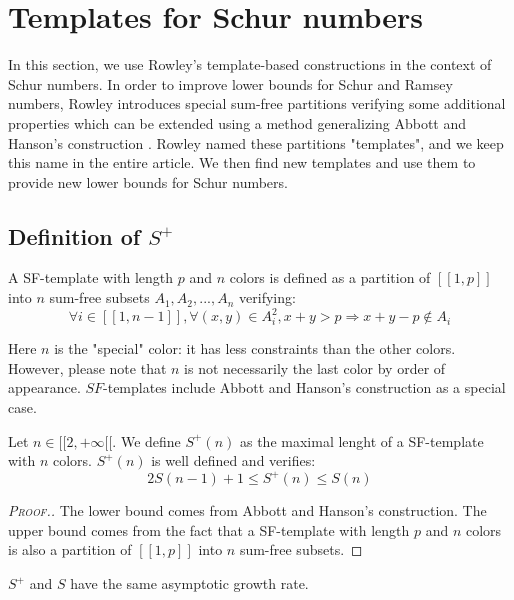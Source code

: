 \section{Templates for Schur numbers}
\label{Schur}

\qquad In this section, we use Rowley's template-based constructions \cite{RowleyRamsey} in the context of Schur 
numbers. In order to improve lower bounds for Schur and Ramsey numbers, Rowley introduces special sum-free 
partitions verifying some additional properties which can be extended using a method generalizing Abbott and 
Hanson's construction \cite{AbbottHanson}. Rowley named these partitions "templates", and we keep this name in 
the entire article. We then find new templates and use them to provide new lower bounds for Schur numbers.

\subsection{Definition of \(S^+\)}

\begin{definition}
A SF-template with length \(p\) and \(n\) colors is defined as a partition of \( [\![1,p]\!]\) into \(n\) sum-free subsets 
\(A_1, A_2, ..., A_n\) verifying:
\[
\forall i \in [\![1, n-1]\!], \forall (x,y) \in A_i^2, x+y > p
\Longrightarrow x+y-p \notin A_i
\]
\end{definition}

Here \(n\) is the "special" color: it has less constraints than the other colors. However, please note that \(n\) 
is not necessarily the last color by order of appearance. \(SF\)-templates include Abbott and Hanson's construction \cite{AbbottHanson}
as a special case.

\begin{proposition}
	Let \(n \in [\![2, +\infty[\![\). We define \(S^+(n)\) as the maximal lenght of a SF-template with \(n\) colors. 
	\(S^+(n)\) is well defined and verifies:
	\[
	2S(n-1)+1 \leqslant S^+(n) \leqslant S(n)
	\]
\end{proposition}

\begin{proof}[\textsc{Proof.}]
The lower bound comes from Abbott and Hanson's construction. The upper bound comes from the 
fact that a SF-template with length \(p\) and \(n\) colors is also a partition of \([\![1, p]\!]\) into \(n\) sum-free subsets.
\end{proof}

\begin{remark}
	\(S^+\) and \(S\) have the same asymptotic growth rate.
\end{remark}



